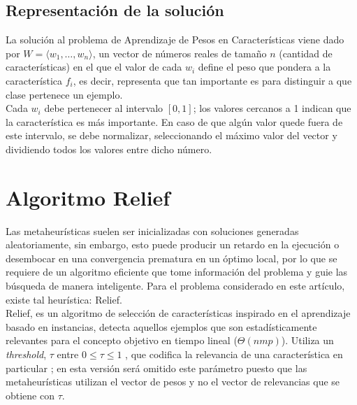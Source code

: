 \documentclass{ci5652}
\begin{document}

\subsection{Representación de la solución}

La solución al problema de Aprendizaje de Pesos en Características viene dado
por $W = \langle w_1, \dots, w_n\rangle$, un vector de números reales de tamaño
$n$ (cantidad de características) en el que el valor de cada $w_i$  define el
peso que pondera a la  característica $f_i$, es decir, representa que tan
importante es para distinguir a que clase pertenece un ejemplo.\\

Cada $w_i$ debe pertenecer al intervalo $[0,1]$; los valores cercanos a 1 indican
que la característica es más importante. En caso de que algún valor quede fuera
de este intervalo, se debe normalizar, seleccionando el máximo valor del vector
y dividiendo todos los valores entre dicho número.

\section{Algoritmo Relief}

Las metaheurísticas suelen ser inicializadas con soluciones generadas
aleatoriamente, sin embargo, esto puede producir un retardo en la ejecución o
desembocar en una convergencia prematura en un óptimo local, por lo que se
requiere de un algoritmo eficiente que tome información del problema y guie las
búsqueda de manera inteligente. Para el problema considerado en este artículo,
existe tal heurística: Relief.\\

Relief, es un algoritmo de selección de características inspirado en el
aprendizaje basado en instancias, detecta aquellos ejemplos que son
estadísticamente relevantes para el concepto objetivo en tiempo lineal
($\Theta(nmp)$). Utiliza un \textit{threshold}, $\tau$ entre
$0 \leq \tau \leq 1$ , que codifica la relevancia de una característica en
particular \cite{Kira_1992};  en esta versión será omitido este parámetro puesto
que las metaheurísticas utilizan el vector de pesos y no el vector de
relevancias que se obtiene con $\tau$.\\
\end{document}
